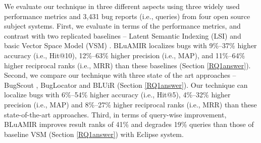 \documentclass[conference]{IEEEtran}
\begin{document}

We evaluate our technique in three different aspects using
three widely used performance metrics and 3,431 bug reports (i.e.,
queries) from four open source subject systems. 
First, we evaluate in terms of the performance metrics, and contrast with two replicated baselines -- Latent Semantic Indexing (LSI) \cite{MarcusLSI} and basic Vector Space Model (VSM) \cite{vector-space-model}.
BLuAMIR localizes bugs with 9\%--37\% higher accuracy (i.e., Hit@10), 12\%--63\% higher precision (i.e., MAP), and 11\%--64\% higher reciprocal ranks (i.e., MRR) than these baselines (Section  \ref{RQ1answer}).
Second, we compare our technique with three state of the art approaches -- BugScout \cite{Nguyen}, BugLocator \cite{Jian} and BLUiR \cite{Saha} (Section \ref{RQ1answer}).
Our technique can localize bugs with 6\%--54\% higher accuracy (i.e., Hit@5), 4\%--32\% higher precision (i.e., MAP) and 8\%--27\% higher reciprocal ranks (i.e., MRR) than these state-of-the-art approaches.
Third, in terms of query-wise improvement, BLuAMIR improves result ranks of 41\% and degrades 19\% queries than those of baseline VSM (Section \ref{RQ1answer}) with Eclipse system.
\end{document}
